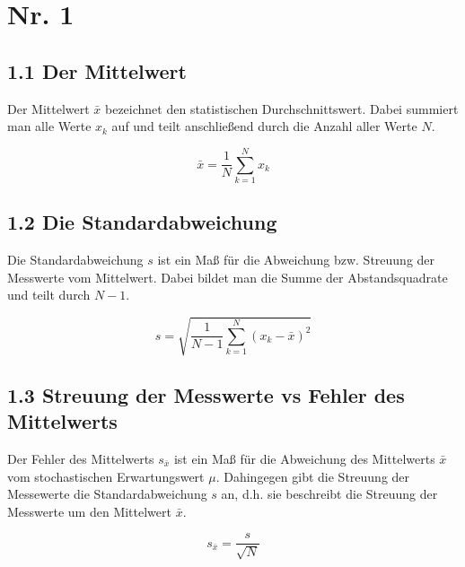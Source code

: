 %
%
%
%
%
%
%
%




\section*{Nr. 1}

\subsection*{1.1 Der Mittelwert}
Der Mittelwert $\bar{x}$ bezeichnet den statistischen Durchschnittswert. 
Dabei summiert man alle Werte $x_k$ auf und teilt anschließend durch die Anzahl aller Werte $N$.

\begin{equation}
    \bar{x} = \frac{1}{N} \sum_{k=1}^{N} x_k
\end{equation}

\subsection*{1.2 Die Standardabweichung}
Die Standardabweichung $s$ ist ein Maß für die Abweichung bzw. Streuung der Messwerte vom Mittelwert.
Dabei bildet man die Summe der Abstandsquadrate und teilt durch $N-1$.

\begin{equation}
    s = \sqrt{\frac{1}{N-1} \sum_{k=1}^{N} \left(x_k - \bar{x}\right)^2 }
\end{equation}

\subsection*{1.3 Streuung der Messwerte vs Fehler des Mittelwerts}
Der Fehler des Mittelwerts $s_{\bar{x}}$ ist ein Maß für die Abweichung des Mittelwerts $\bar{x}$ vom stochastischen Erwartungswert $\mu$.
Dahingegen gibt die Streuung der Messewerte die Standardabweichung $s$ an,
d.h. sie beschreibt die Streuung der Messwerte um den Mittelwert $\bar{x}$.

\begin{equation}
    s_{\bar{x}}=\frac{s}{\sqrt{N}}
\end{equation}

